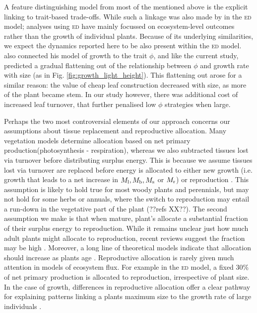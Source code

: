 \documentclass[a4paper,11pt]{article}
\begin{document}
A feature distinguishing model from most of the mentioned above is the explicit linking to trait-based trade-offs. While such a linkage was also made by \citet{Moorcroft-2001} in the \textsc{ed} model; analyses using \textsc{ed} have mainly focussed on ecosystem-level outcomes rather than the growth of individual plants. Because of its underlying similarities, we expect the dynamics reported here to be also present within the \textsc{ed} model. \citet{King-1999} also connected his model of growth to the trait $\phi$, and like the current study, predicted a gradual flattening out of the relationship between $\phi$ and growth rate with size (as in Fig. \ref{fig:growth_light_height}). This flattening out arose for a similar reason: the value of cheap leaf construction decreased with size, as more of the plant became stem. In our study however, there was additional cost of increased leaf turnover, that further penalised low $\phi$ strategies when large.

Perhaps the two most controversial elements of our approach concerns our assumptions about tissue replacement and reproductive allocation. Many vegetation models determine allocation based on net primary production(photosynthesis - respiration), whereas we also subtracted tissues lost via turnover before distributing surplus energy. This is because  we assume tissues lost via turnover are replaced before energy is allocated to either new growth (i.e. growth that leads to a net increase in $M_{\rm l}, M_{\rm b}, M_{\rm s}$ or $M_{\rm r}$) or reproduction \citep{Thornley-2000}. This assumption is likely to hold true for most woody plants and perennials, but may not hold for some herbs or annuals, where the switch to reproduction may entail a run-down in the vegetative part of the plant (??refs XX??). The second assumption we make is that when mature, plant's allocate a substantial fraction of their surplus energy to reproduction. While it remains unclear just how much adult plants might allocate to reproduction, recent reviews suggest the fraction may be high \citep{Thomas-2011, Wenk-2015}. Moreover, a long line of theoretical models indicate that allocation should increase as plants age \citep[reviewed by ][]{Wenk-2015}. Reproductive allocation is rarely given much attention in models of ecosystem flux. For example in the \textsc{ed} model, a fixed 30\% of net primary production is allocated to reproduction, irrespective of plant size. In the case of growth, differences in reproductive allocation offer a clear pathway for explaining patterns linking a plants maximum size to the growth rate of large individuals \citep[e.g.][]{Wright-2010}.
\end{document}
